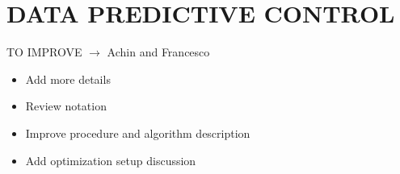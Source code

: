 \section{DATA PREDICTIVE CONTROL}
\label{S:dpc}
TO IMPROVE $\rightarrow$ \textcolor[rgb]{0,0,1}{Achin and Francesco}
\begin{itemize}
	\item Add more details
	\item Review notation
	\item Improve procedure and algorithm description
	\item Add optimization setup discussion
\end{itemize}

%
%
%

